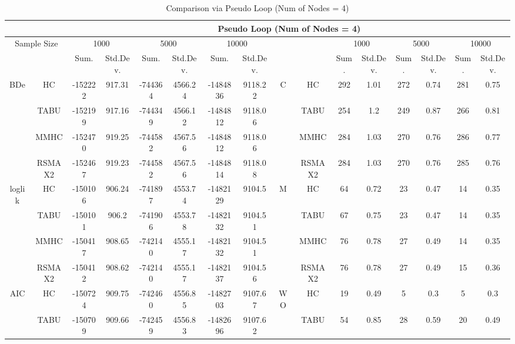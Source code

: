 \begin{table}[p]																										
\centering	\caption{Comparison via Pseudo Loop (Num of Nodes = 4)}	\tiny																						
{\tabcolsep=0.01in																										
\begin{tabular}{cc||cc|cc|cc||cc|cc|cc|cc}																										
\hline																										
&	&	\multicolumn{14}{c}{Pseudo Loop	(Num	of	Nodes	=	4)}\tabularnewline																			
\hline																										
\multicolumn{2}{c||}{Sample	Size}	&	\multicolumn{2}{c|}{1000}	&	\multicolumn{2}{c|}{5000}	&	\multicolumn{2}{c||}{10000}	&	&	&	\multicolumn{2}{c|}{1000}	&	\multicolumn{2}{c|}{5000}	&	\multicolumn{2}{c}{10000}\tabularnewline											
\hline																										
&	&	Sum.	&	Std.Dev.	&	Sum.	&	Std.Dev.	&	Sum.	&	Std.Dev.	&	&	&	Sum.	&	Std.Dev.	&	Sum.	&	Std.Dev.	&	Sum.	&	Std.Dev.\tabularnewline
\hline																										
\hline																										
\multirow{4}{*}{BDe} & HC &	-152222 & 	917.31 & 	-744364 & 	4566.24 & 	-1484836 & 	9118.22 & 	\multirow{4}{*}{C} & HC &	292 & 	1.01 & 	272 & 	0.74 & 	281 & 	0.75\tabularnewline													
& TABU &	-152199 & 	917.16 & 	-744349 & 	4566.12 & 	-1484812 & 	9118.06 & 	& TABU &	254 & 	1.2 & 	249 & 	0.87 & 	266 & 	0.81\tabularnewline													
& MMHC &	-152470 & 	919.25 & 	-744582 & 	4567.56 & 	-1484812 & 	9118.06 & 	& MMHC &	284 & 	1.03 & 	270 & 	0.76 & 	286 & 	0.77\tabularnewline													
& RSMAX2 &	-152467 & 	919.23 & 	-744582 & 	4567.56 & 	-1484814 & 	9118.08 & 	& RSMAX2 &	284 & 	1.03 & 	270 & 	0.76 & 	285 & 	0.76\tabularnewline													
\hline																										
\multirow{4}{*}{loglik} & HC &	-150106 & 	906.24 & 	-741897 & 	4553.74 & 	-1482129 & 	9104.5 & 	\multirow{4}{*}{M} & HC &	64 & 	0.72 & 	23 & 	0.47 & 	14 & 	0.35\tabularnewline													
& TABU &	-150101 & 	906.2 & 	-741906 & 	4553.78 & 	-1482132 & 	9104.51 & 	& TABU &	67 & 	0.75 & 	23 & 	0.47 & 	14 & 	0.35\tabularnewline													
& MMHC &	-150417 & 	908.65 & 	-742140 & 	4555.17 & 	-1482132 & 	9104.51 & 	& MMHC &	76 & 	0.78 & 	27 & 	0.49 & 	14 & 	0.35\tabularnewline													
& RSMAX2 &	-150412 & 	908.62 & 	-742140 & 	4555.17 & 	-1482137 & 	9104.56 & 	& RSMAX2 &	76 & 	0.78 & 	27 & 	0.49 & 	15 & 	0.36\tabularnewline													
\hline																										
\multirow{4}{*}{AIC} & HC &	-150724 & 	909.75 & 	-742460 & 	4556.85 & 	-1482703 & 	9107.67 & 	\multirow{4}{*}{WO} & HC &	19 & 	0.49 & 	5 & 	0.3 & 	5 & 	0.3\tabularnewline													
& TABU &	-150709 & 	909.66 & 	-742459 & 	4556.83 & 	-1482696 & 	9107.62 & 	& TABU &	54 & 	0.85 & 	28 & 	0.59 & 	20 & 	0.49\tabularnewline													

\end{tabular}}
\end{table}
